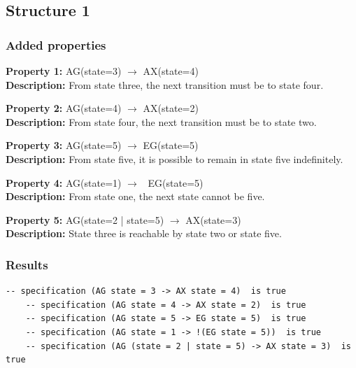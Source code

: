 \documentclass[11pt]{article}
\begin{document}
\subsection{Structure 1}
	\subsubsection{Added properties}
	
		\textbf{Property 1:} 	AG(state=3) $\to$ AX(state=4) 	\\	
		\textbf{Description:} From state three, the next transition must be to state four. \\
		\vspace{12pt}
		
		\textbf{Property 2:} AG(state=4) $\to$ AX(state=2)\\ 
		\textbf{Description:} From state four, the next transition must be to state two. \\
		\vspace{12pt}
		
		\textbf{Property 3:} 	AG(state=5) $\to$ EG(state=5)\\ 
		\textbf{Description:} From state five, it is possible to remain in state five indefinitely. \\
		\vspace{12pt}
		
		\textbf{Property 4:} AG(state=1) $\to$ ~EG(state=5) \\
		\textbf{Description:} From state one, the next state cannot be five.\\
		\vspace{12pt}
		
		\textbf{Property 5:} AG(state=2 | state=5) $\to$ AX(state=3)  \\
		\textbf{Description:} State three is reachable by state two or state five.\\
	
	
	\subsubsection{Results}
	
	\begin{lstlisting}[caption=NuSMV Kripke Diagram Output, label=p2_1_out]	
	-- specification (AG state = 3 -> AX state = 4)  is true
	-- specification (AG state = 4 -> AX state = 2)  is true
	-- specification (AG state = 5 -> EG state = 5)  is true
	-- specification (AG state = 1 -> !(EG state = 5))  is true
	-- specification (AG (state = 2 | state = 5) -> AX state = 3)  is true
	\end{lstlisting}
	
\end{document}
